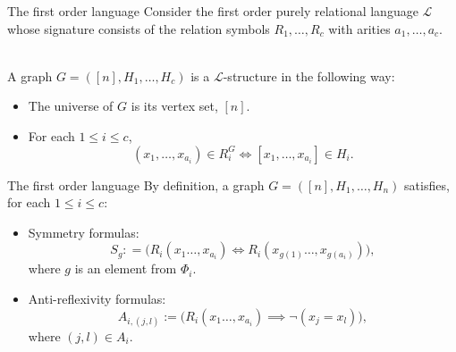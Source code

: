 \documentclass[11pt]{beamer}
\begin{document}
	\begin{frame}{The first order language}
	Consider the first order purely relational language $\mathcal{L}$ whose signature consists of the relation symbols
	$R_1,\dots, R_c$ with arities $a_1,\dots,a_c$. \\~ \par
	
	A graph $G=([n],H_1,\dots, H_c)$ is a $\mathcal{L}$-structure in the following way:
	\begin{itemize}
		\item The universe of $G$ is its vertex set, $[n]$.
		\item For each $1\leq i \leq c$, 
		\[(x_1,\dots,x_{a_i})\in R_i^G \iff [x_1,\dots, x_{a_i}]\in H_i. \] 
	\end{itemize}
	\end{frame}

	\begin{frame}{The first order language}
		By definition, a graph $G=([n],H_1,\dots, H_n)$ satisfies, for each $1\leq i \leq c$:
		\vspace{0.5 em}
		\begin{itemize}
			\item Symmetry formulas:
			\[ S_g: =\big( R_i(x_1\dots,x_{a_i})\iff R_i(x_{g(1)}\dots,x_{g(a_i)})\big) ,\]
			where $g$ is an element from $\Phi_i$.
			\item Anti-reflexivity formulas:
			\[A_{i,(j,l)}:=\big(R_i(x_1\dots,x_{a_i})\implies 
			\neg(x_j= x_l)\big),\]
			where $(j,l)\in A_i$.
		\end{itemize}
		
	\end{frame}
	 
\end{document}
